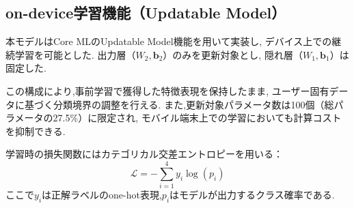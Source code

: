 \subsection{on-device学習機能（Updatable Model）}

本モデルはCore MLのUpdatable Model機能を用いて実装し,
デバイス上での継続学習を可能とした.
出力層（$W_2, \mathbf{b}_2$）のみを更新対象とし,
隠れ層（$W_1, \mathbf{b}_1$）は固定した.

この構成により,事前学習で獲得した特徴表現を保持したまま,
ユーザー固有データに基づく分類境界の調整を行える.
また,更新対象パラメータ数は100個（総パラメータの27.5\%）に限定され,
モバイル端末上での学習においても計算コストを抑制できる.

学習時の損失関数にはカテゴリカル交差エントロピーを用いる：
\begin{equation}
\mathcal{L} = -\sum_{i=1}^{4} y_i \log(p_i)
\end{equation}
ここで$y_i$は正解ラベルのone-hot表現,$p_i$はモデルが出力するクラス確率である.
